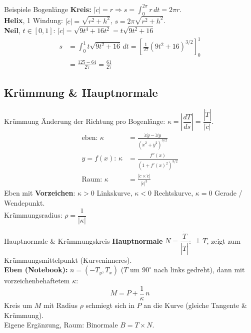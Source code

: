 \documentclass[a4paper, fontsize=7pt]{scrartcl}
\def\dt{\,dt}
\begin{document}
\begin{subbox}{Beispiele Bogenlänge}
\textbf{Kreis:} $|\dot c| = r \Rightarrow s = \int_0^{2\pi} r \dt = 2\pi r$.\\[2pt]
\textbf{Helix}, 1 Windung: $|\dot c| = \sqrt{r^2 + h^2}$,
$s = 2\pi\sqrt{r^2 + h^2}$.\\[2pt]
\textbf{Neil}, $t \in [0, 1]$: $|\dot c| = \sqrt{9t^4 + 16t^2} = t\sqrt{9t^2 + 16}$
\begin{align*}
s &= \int_0^1 t\sqrt{9t^2 + 16} \dt
   = \left[\tfrac{1}{27}(9t^2 + 16)^{3/2}\right]_0^1\\
  &= \tfrac{125 - 64}{27} = \tfrac{61}{27}
\end{align*}
\end{subbox}

\subsection{Krümmung \& Hauptnormale}

\begin{mainbox}{Krümmung}
Änderung der Richtung pro Bogenlänge: $\kappa = \left|\dfrac{dT}{ds}\right|
= \dfrac{|\dot T|}{|\dot c|}$.
\begin{align*}
\text{eben: } \kappa &= \frac{\dot x \ddot y - \ddot x \dot y}
  {\left(\dot x^2 + \dot y^2\right)^{3/2}}\\
y = f(x)\text{: } \kappa &= \frac{f''(x)}{\left(1 + f'(x)^2\right)^{3/2}}\\
\text{Raum: } \kappa &= \frac{|\dot c \times \ddot c|}{|\dot c|^3}
\end{align*}
Eben mit \textbf{Vorzeichen}: $\kappa > 0$ Linkskurve, $\kappa < 0$
Rechtskurve, $\kappa = 0$ Gerade / Wendepunkt.\\
Krümmungsradius: $\rho = \dfrac{1}{|\kappa|}$
\end{mainbox}

\begin{mainbox}{Hauptnormale \& Krümmungskreis}
\textbf{Hauptnormale} $N = \dfrac{\dot T}{|\dot T|}$: $\perp T$, zeigt zum
Krümmungsmittelpunkt (Kurveninneres).\\[2pt]
\textbf{Eben (Notebook):} $n = (-T_y, T_x)$ ($T$ um $90^\circ$ nach links
gedreht), dann mit vorzeichenbehaftetem $\kappa$:
$$M = P + \frac{1}{\kappa}\, n$$
Kreis um $M$ mit Radius $\rho$ schmiegt sich in $P$ an die Kurve
(gleiche Tangente \& Krümmung).\\[2pt]
Eigene Ergänzung, Raum: Binormale $B = T \times N$.
\end{mainbox}
\end{document}
